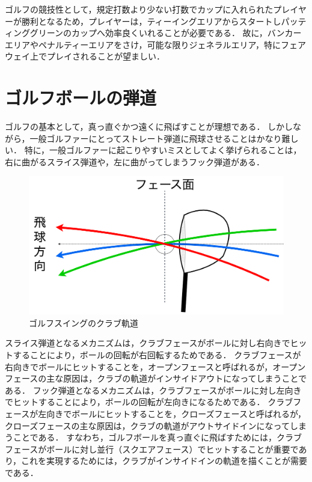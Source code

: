 ゴルフの競技性として，規定打数より少ない打数でカップに入れられたプレイヤーが勝利となるため，プレイヤーは，ティーイングエリアからスタートしパッティンググリーンのカップへ効率良くいれることが必要である．
故に，バンカーエリアやペナルティーエリアをさけ，可能な限りジェネラルエリア，特にフェアウェイ上でプレイされることが望ましい．

\section{ゴルフボールの弾道}
ゴルフの基本として，真っ直ぐかつ遠くに飛ばすことが理想である．
しかしながら，一般ゴルファーにとってストレート弾道に飛球させることはかなり難しい．
特に，一般ゴルファーに起こりやすいミスとしてよく挙げられることは，右に曲がるスライス弾道や，左に曲がってしまうフック弾道がある．
\begin{figure}
    \centering
    \includegraphics[width=1.0\linewidth]{./images/insidein.png}
    \caption{ゴルフスイングのクラブ軌道}
\end{figure}

スライス弾道となるメカニズムは，クラブフェースがボールに対し右向きでヒットすることにより，ボールの回転が右回転するためである．
クラブフェースが右向きでボールにヒットすることを，オープンフェースと呼ばれるが，オープンフェースの主な原因は，クラブの軌道がインサイドアウトになってしまうことである．
フック弾道となるメカニズムは，クラブフェースがボールに対し左向きでヒットすることにより，ボールの回転が左向きになるためである．
クラブフェースが左向きでボールにヒットすることを，クローズフェースと呼ばれるが，クローズフェースの主な原因は，クラブの軌道がアウトサイドインになってしまうことである．
すなわち，ゴルフボールを真っ直ぐに飛ばすためには，クラブフェースがボールに対し並行（スクエアフェース）でヒットすることが重要であり，これを実現するためには，クラブがインサイドインの軌道を描くことが需要である．

